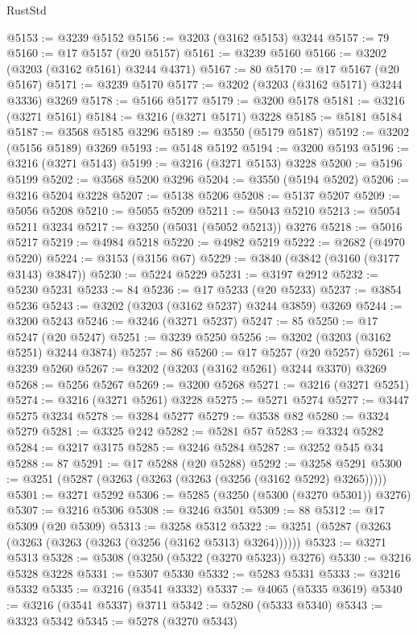 \begin{lexlean}{RustStd}
\begin{coremodule}
@5153 := @3239 @5152
@5156 := @3203 (@3162 @5153) @3244
@5157 := 79
@5160 := @17 @5157 (@20 @5157)
@5161 := @3239 @5160
@5166 := @3202 (@3203 (@3162 @5161) @3244 @4371)
@5167 := 80
@5170 := @17 @5167 (@20 @5167)
@5171 := @3239 @5170
@5177 := @3202 (@3203 (@3162 @5171) @3244 @3336) @3269
@5178 := @5166 @5177
@5179 := @3200 @5178
@5181 := @3216 (@3271 @5161)
@5184 := @3216 (@3271 @5171) @3228
@5185 := @5181 @5184
@5187 := @3568 @5185 @3296
@5189 := @3550 (@5179 @5187)
@5192 := @3202 (@5156 @5189) @3269
@5193 := @5148 @5192
@5194 := @3200 @5193
@5196 := @3216 (@3271 @5143)
@5199 := @3216 (@3271 @5153) @3228
@5200 := @5196 @5199
@5202 := @3568 @5200 @3296
@5204 := @3550 (@5194 @5202)
@5206 := @3216 @5204 @3228
@5207 := @5138 @5206
@5208 := @5137 @5207
@5209 := @5056 @5208
@5210 := @5055 @5209
@5211 := @5043 @5210
@5213 := @5054 @5211 @3234
@5217 := @3250 (@5031 (@5052 @5213)) @3276
@5218 := @5016 @5217
@5219 := @4984 @5218
@5220 := @4982 @5219
@5222 := @2682 (@4970 @5220)
@5224 := @3153 (@3156 @67)
@5229 := @3840 (@3842 (@3160 (@3177 @3143) @3847))
@5230 := @5224 @5229
@5231 := @3197 @2912
@5232 := @5230 @5231
@5233 := 84
@5236 := @17 @5233 (@20 @5233)
@5237 := @3854 @5236
@5243 := @3202 (@3203 (@3162 @5237) @3244 @3859) @3269
@5244 := @3200 @5243
@5246 := @3246 (@3271 @5237)
@5247 := 85
@5250 := @17 @5247 (@20 @5247)
@5251 := @3239 @5250
@5256 := @3202 (@3203 (@3162 @5251) @3244 @3874)
@5257 := 86
@5260 := @17 @5257 (@20 @5257)
@5261 := @3239 @5260
@5267 := @3202 (@3203 (@3162 @5261) @3244 @3370) @3269
@5268 := @5256 @5267
@5269 := @3200 @5268
@5271 := @3216 (@3271 @5251)
@5274 := @3216 (@3271 @5261) @3228
@5275 := @5271 @5274
@5277 := @3447 @5275 @3234
@5278 := @3284 @5277
@5279 := @3538 @82
@5280 := @3324 @5279
@5281 := @3325 @242
@5282 := @5281 @57
@5283 := @3324 @5282
@5284 := @3217 @3175
@5285 := @3246 @5284
@5287 := @3252 @545 @34
@5288 := 87
@5291 := @17 @5288 (@20 @5288)
@5292 := @3258 @5291
@5300 := @3251 (@5287 (@3263 (@3263 (@3263 (@3256 (@3162 @5292) @3265)))))
@5301 := @3271 @5292
@5306 := @5285 (@3250 (@5300 (@3270 @5301)) @3276)
@5307 := @3216 @5306
@5308 := @3246 @3501
@5309 := 88
@5312 := @17 @5309 (@20 @5309)
@5313 := @3258 @5312
@5322 := @3251 (@5287 (@3263 (@3263 (@3263 (@3263 (@3256 (@3162 @5313) @3264))))))
@5323 := @3271 @5313
@5328 := @5308 (@3250 (@5322 (@3270 @5323)) @3276)
@5330 := @3216 @5328 @3228
@5331 := @5307 @5330
@5332 := @5283 @5331
@5333 := @3216 @5332
@5335 := @3216 (@3541 @3332)
@5337 := @4065 (@5335 @3619)
@5340 := @3216 (@3541 @5337) @3711
@5342 := @5280 (@5333 @5340)
@5343 := @3323 @5342
@5345 := @5278 (@3270 @5343)

\end{coremodule}
\end{lexlean}
